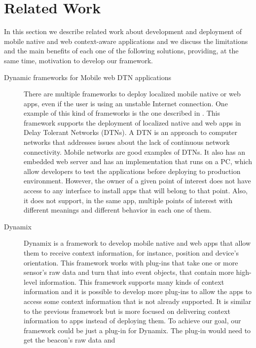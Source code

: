 
%
%

\section{Related Work}
\label{related_work}
In this section we describe related work about
development and deployment of mobile native and web 
context-aware applications and we discuss the 
limitations and the main benefits of each one of
the following solutions, providing, at the same time,
motivation to develop our framework.
\begin{description}
  \item[Dynamic frameworks for Mobile web DTN applications]
  There are multiple frameworks to deploy localized
  mobile native or web apps, even if the user is using an
  unstable Internet connection. One example of this
  kind of frameworks is the one
  described in \cite{Sankaran2014}.
  This framework supports the deployment of localized 
  native and
  web apps in Delay Tolerant Networks (DTNs).
  A DTN is an approach to computer networks that 
  addresses issues about the lack of continuous network
  connectivity. Mobile networks are good examples of DTNs. 
  It also has an embedded web server 
  and has an implementation that runs on a PC, which allow
  developers to test the applications before deploying
  to production environment.
  However, the owner of a given point of interest does not
  have access to any interface to install apps that will
  belong to that point. Also, it does not support, in the
  same app, multiple points of interest with different
  meanings and different behavior in each one of them. 
  \item[Dynamix]
  Dynamix \cite{Carlson2012} is a framework to develop
  mobile native and web apps that allow them to receive
  context information, for instance, position and device's
  orientation. This framework works with plug-ins that take
  one or more sensor's raw data and turn that into event
  objects, that contain more high-level information.
  This framework supports many kinds of context information
  and it is possible to develop more plug-ins to allow the
  apps to access some context information that is not
  already supported. It is similar to the previous
  framework but is more focused on delivering context
  information to apps instead of deploying them.
  To achieve our goal, our framework could be just a
  plug-in for Dynamix. The plug-in would
  need to get the beacon's raw data and

\end{description}
